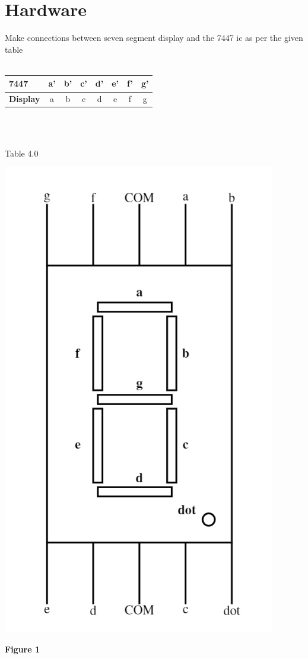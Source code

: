 \documentclass[journal,12pt,twocolumn]{IEEEtran}
\begin{document}
\section{Hardware}
\raggedright
Make connections between seven segment display and the 7447 ic as per the given table\\
\
\centering
\\\begin{tabular}{|l|c|c|c|c|c|c|c|}
\hline
\textbf{7447} & a' & b' & c' & d' & e' & f' & g'\\
\hline
\textbf{Display} & a & b & c & d & e & f & g\\
\hline
\end{tabular}\\
\
\centerline{Table 4.0}

\includegraphics{ss fig.png}
\begin{center}
\textbf{Figure 1}
\end{center}
\end{document}
